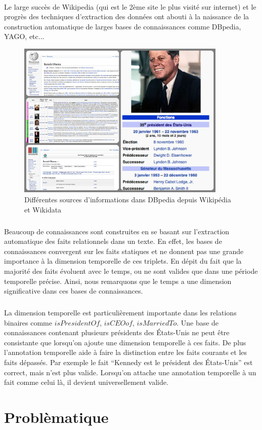 \paragraph{}
Le large succès de Wikipedia (qui est le 2ème site le plus visité sur internet) et le progrès des techniques d’extraction des données ont abouti à la naissance de la construction automatique  de larges bases de connaissances comme DBpedia, YAGO, etc...
\begin{figure}[H]
\centering
\includegraphics[width=10cm]{Sources.png}
\caption{Différentes sources d'informations dans DBpedia depuis Wikipédia et Wikidata}
\end{figure}
\subparagraph{}
Beaucoup de connaissances sont construites en se basant sur l’extraction automatique des faits relationnels dans un texte.
En effet, les bases de connaissances convergent sur les faits statiques et ne donnent pas une grande importance à la dimension temporelle de ces triplets.
En dépit du fait que la majorité des faits évoluent avec le temps, ou ne sont valides que dans une période temporelle précise. Ainsi, nous remarquons que le temps a une dimension significative dans ces bases de connaissances.
\subparagraph{}
La dimension temporelle est particulièrement importante dans les relations binaires comme $isPresidentOf$, $isCEOof$, $isMarriedTo$. Une base de connaissances contenant plusieurs présidents des États-Unis ne peut être consistante que lorsqu’on ajoute une dimension temporelle à ces faits. De plus l’annotation temporelle aide à faire la distinction entre les faits courants et les faits dépassés.
Par exemple le fait ``Kennedy est le président des États-Unis'' est correct, mais n'est plus valide.
Lorsqu’on attache une annotation temporelle à un fait comme celui là, il devient universellement valide.

\section{Problèmatique}
